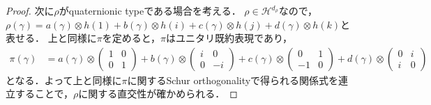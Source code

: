 \documentclass[11pt]{article}
\theoremstyle{definition}
\begin{document}
\begin{proof}
    次に$\rho$がquaternionic typeである場合を考える．
    $\rho \in \mathcal{H}^{d_\rho}$なので，$\rho(\gamma)=a(\gamma)\otimes h(1) + b(\gamma) \otimes h(i)+c(\gamma) \otimes h(j) + d(\gamma) \otimes h(k)$と表せる．
    上と同様に$\pi$を定めると，$\pi$はユニタリ既約表現であり，
    \begin{align*}
    \pi(\gamma) &= a(\gamma) \otimes \begin{pmatrix} 1 & 0 \\ 0 & 1 \end{pmatrix} 
            + b(\gamma) \otimes \begin{pmatrix} i & 0 \\ 0 & -i \end{pmatrix}
            + c(\gamma) \otimes \begin{pmatrix} 0 & 1 \\ -1 & 0 \end{pmatrix}
            + d(\gamma) \otimes \begin{pmatrix} 0 & i \\ i & 0 \end{pmatrix} %
        \end{align*}
    となる．よって上と同様に$\pi$に関するSchur orthogonalityで得られる関係式を連立することで，$\rho$に関する直交性が確かめられる．
\end{proof}
\end{document}
